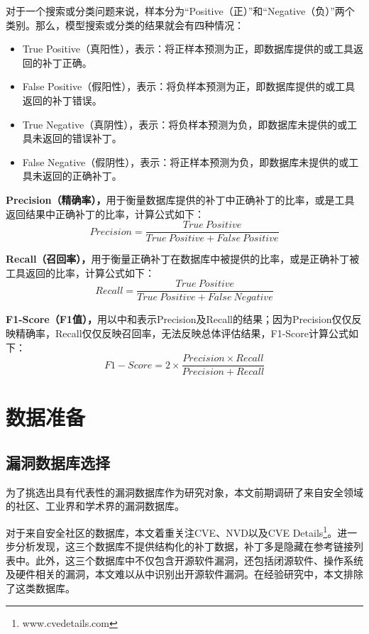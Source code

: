 对于一个搜索或分类问题来说，样本分为“Positive（正）”和“Negative（负）”两个类别。那么，模型搜索或分类的结果就会有四种情况：
\begin{itemize}
    \item True Positive（真阳性），表示：将正样本预测为正，即数据库提供的或工具返回的补丁正确。
    \item False Positive（假阳性），表示：将负样本预测为正，即数据库提供的或工具返回的补丁错误。
    \item True Negative（真阴性），表示：将负样本预测为负，即数据库未提供的或工具未返回的错误补丁。
    \item False Negative（假阴性），表示：将正样本预测为负，即数据库未提供的或工具未返回的正确补丁。
\end{itemize}

\textbf{Precision（精确率），}用于衡量数据库提供的补丁中正确补丁的比率，或是工具返回结果中正确补丁的比率，计算公式如下：
\begin{equation}\label{eq:precision}
    Precision=\frac{True\ Positive}{True\ Positive + False\ Positive} 
\end{equation}

\textbf{Recall（召回率），}用于衡量正确补丁在数据库中被提供的比率，或是正确补丁被工具返回的比率，计算公式如下：
\begin{equation}\label{eq:recall}
    Recall=\frac{True\ Positive}{True\ Positive + False\ Negative} 
\end{equation}

\textbf{F1-Score（F1值），}用以中和表示Precision及Recall的结果；因为Precision仅仅反映精确率，Recall仅仅反映召回率，无法反映总体评估结果，F1-Score计算公式如下：
\begin{equation}\label{eq:f1}
    F1-Score=2 \times \frac{Precision \times Recall}{Precision + Recall} 
\end{equation}

\section{数据准备}\label{sec:preparation}
\subsection{漏洞数据库选择}
为了挑选出具有代表性的漏洞数据库作为研究对象，本文前期调研了来自安全领域的社区、工业界和学术界的漏洞数据库。

对于来自安全社区的数据库，本文着重关注CVE、NVD以及CVE Details\footnote{www.cvedetails.com}。进一步分析发现，这三个数据库不提供结构化的补丁数据，补丁多是隐藏在参考链接列表中。此外，这三个数据库中不仅包含开源软件漏洞，还包括闭源软件、操作系统及硬件相关的漏洞，本文难以从中识别出开源软件漏洞。在经验研究中，本文排除了这类数据库。

